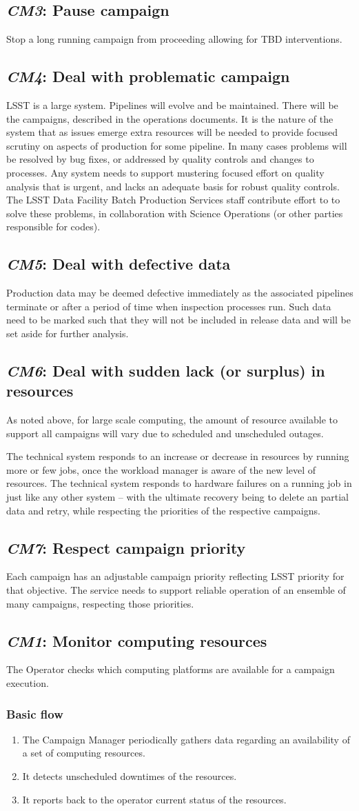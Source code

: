 \documentclass[DM,lsstdraft,toc]{lsstdoc}
\newcommand{\usecase}[2]{\subsection{\emph{#1}: #2}\label{use:#1}}
\newenvironment{flow}[1][Basic flow]
  {\subsubsection*{#1}\begin{enumerate}[label=\alph*.,itemsep=0pt]}
  {\end{enumerate}}
\begin{document}
\usecase{CM3}{Pause campaign}
Stop a long running campaign from proceeding allowing for TBD interventions.

\usecase{CM4}{Deal with problematic campaign}
LSST is a large system. Pipelines will evolve and be maintained. There will be
the campaigns, described in the operations documents. It is the nature of the
system that as issues emerge extra resources will be needed to provide focused
scrutiny on aspects of production for some pipeline. In many cases problems
will be resolved by bug fixes, or addressed by quality controls and changes to
processes. Any system needs to support mustering focused effort on quality
analysis that is urgent, and lacks an adequate basis for robust quality
controls.  The LSST Data Facility Batch Production Services staff contribute
effort to to solve these problems, in collaboration with Science Operations (or
other parties responsible for codes).

\usecase{CM5}{Deal with defective data}
Production data may be deemed defective immediately as the associated pipelines
terminate or after a period of time when inspection processes run.  Such data
need to be marked such that they will not be included in release data and will
be set aside for further analysis.

\usecase{CM6}{Deal with sudden lack (or surplus) in resources}
As noted above, for large scale computing, the amount of resource available to
support all campaigns will vary due to scheduled and unscheduled outages.

The technical system responds to an increase or decrease in resources by
running more or few jobs, once the workload manager is aware of the new level
of resources. The technical system responds to hardware failures on a running
job in just like any other system -- with the ultimate recovery being to delete
an partial data and retry, while respecting the priorities of the respective
campaigns.

\usecase{CM7}{Respect campaign priority}
Each campaign has an adjustable campaign priority reflecting LSST priority for
that objective. The service needs to support reliable operation of an ensemble
of many campaigns, respecting those priorities.

\usecase{CM1}{Monitor computing resources}
The Operator checks which computing platforms are available for a campaign
execution.
\begin{flow}
  \item
    The Campaign Manager periodically gathers data regarding an availability of
    a set of computing resources.
  \item
    It detects unscheduled downtimes of the resources.
  \item 
    It reports back to the operator current status of the resources.
\end{flow}
\end{document}
